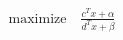 \documentclass[preview]{standalone}
\begin{document}
\begin{align*}
\text{maximize}\quad \frac{c^Tx+\alpha}{d^Tx+\beta}
\end{align*}
\end{document}
